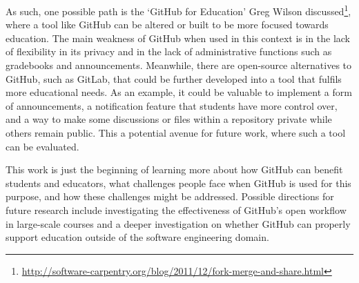 As such, one possible path is the `GitHub for Education' Greg Wilson discussed\footnote{\url{http://software-carpentry.org/blog/2011/12/fork-merge-and-share.html}}, where a tool like GitHub can be altered or built to be more focused towards education. The main weakness of GitHub when used in this context is in the lack of flexibility in its privacy and in the lack of administrative functions such as gradebooks and announcements. Meanwhile, there are open-source alternatives to GitHub, such as GitLab, that could be further developed into a tool that fulfils more educational needs. As an example, it could be valuable to implement a form of announcements, a notification feature that students have more control over, and a way to make some discussions or files within a repository private while others remain public. This a potential avenue for future work, where such a tool can be evaluated.

This work is just the beginning of learning more about how GitHub can benefit students and educators, what challenges people face when GitHub is used for this purpose, and how these challenges might be addressed. Possible directions for future research include investigating the effectiveness of GitHub's open workflow in large-scale courses and a deeper investigation on whether GitHub can properly support education outside of the software engineering domain.

